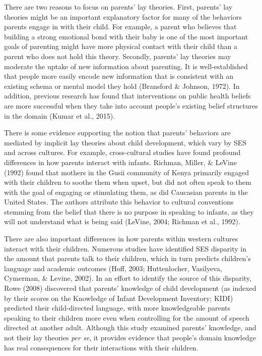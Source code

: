 \documentclass[10pt, letterpaper]{article}
\begin{document}
There are two reasons to focus on parents' lay theories. First, parents'
lay theories might be an important explanatory factor for many of the
behaviors parents engage in with their child. For example, a parent who
believes that building a strong emotional bond with their baby is one of
the most important goals of parenting might have more physical contact
with their child than a parent who does not hold this theory. Secondly,
parents' lay theories may moderate the uptake of new information about
parenting. It is well-established that people more easily encode new
information that is consistent with an existing schema or mental model
they hold (Bransford \& Johnson, 1972). In addition, previous research
has found that interventions on public health beliefs are more
successful when they take into account people's existing belief
structures in the domain (Kumar et al., 2015).

There is some evidence supporting the notion that parents' behaviors are
mediated by implicit lay theories about child development, which vary by
SES and across cultures. For example, cross-cultural studies have found
profound differences in how parents interact with infants. Richman,
Miller, \& LeVine (1992) found that mothers in the Gusii community of
Kenya primarily engaged with their children to soothe them when upset,
but did not often speak to them with the goal of engaging or stimulating
them, as did Caucasian parents in the United States. The authors
attribute this behavior to cultural conventions stemming from the belief
that there is no purpose in speaking to infants, as they will not
understand what is being said (LeVine, 2004; Richman et al., 1992).

There are also important differences in how parents within western
cultures interact with their children. Numerous studies have identified
SES disparity in the amount that parents talk to their children, which
in turn predicts children's language and academic outcomes (Hoff, 2003;
Huttenlocher, Vasilyeva, Cymerman, \& Levine, 2002). In an effort to
identify the source of this disparity, Rowe (2008) discovered that
parents' knowledge of child development (as indexed by their scores on
the Knowledge of Infant Development Inventory; KIDI) predicted their
child-directed language, with more knowledgeable parents speaking to
their children more even when controlling for the amount of speech
directed at another adult. Although this study examined parents'
knowledge, and not their lay theories \emph{per se}, it provides
evidence that people's domain knowledge has real consequences for their
interactions with their children.
\end{document}

